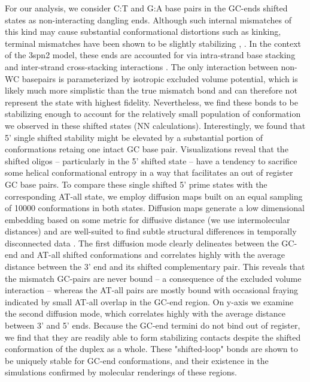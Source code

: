 \documentclass[journal=jpcbfk,manuscript=article]{achemso}
\begin{document}
For our analysis, we consider C:T and G:A base pairs in the GC-ends shifted states as non-interacting dangling ends. Although such internal mismatches of this kind may cause substantial conformational distortions such as kinking, terminal mismatches have been shown to be slightly stabilizing \citep{Santalucia2004TM}, \citep{DiMichele2014EffectHybridization}. In the context of the 3spn2 model, these ends are accounted for via intra-strand base stacking and inter-strand cross-stacking interactions \citep{Hinckley2013AnHybridization}. The only interaction between non-WC basepairs is parameterized by isotropic excluded volume potential, which is likely much more simplistic than the true mismatch bond and can therefore not represent the state with highest fidelity. Nevertheless, we find these bonds to be stabilizing enough to account for the relatively small population of conformation we observed in these shifted states (NN calculations). Interestingly, we found that 5' single shifted stability might be elevated by a substantial portion of conformations retaing one intact GC base pair. Visualizations reveal that the shifted oligos -- particularly in the 5' shifted state -- have a tendency to sacrifice some helical conformational entropy in a way that facilitates an out of register GC base pairs. To compare these single shifted 5' prime states with the corresponding AT-all state, we employ diffusion maps built on an equal sampling of 10000 conformations in both states. Diffusion maps generate a low dimensional embedding based on some metric for diffusive distance (we use intermolecular distances) and are well-suited to find subtle structural differences in temporally disconnected data \citep{Coifman2006DiffusionMaps}. The first diffusion mode clearly delineates between the GC-end and AT-all shifted conformations and correlates highly with the average distance between the 3' end and its shifted complementary pair. This reveals that the mismatch GC-pairs are never bound -- a consequence of the excluded volume interaction -- whereas the AT-all pairs are mostly bound with occasional fraying indicated by small AT-all overlap in the GC-end region. On y-axis we examine the second diffusion mode, which correlates highly with the average distance between 3' and 5' ends. Because the GC-end termini do not bind out of register, we find that they are readily able to form stabilizing contacts despite the shifted conformation of the duplex as a whole. These "shifted-loop" bonds are shown to be uniquely stable for GC-end conformations, and their existence in the simulations confirmed by molecular renderings of these regions. 
\end{document}

